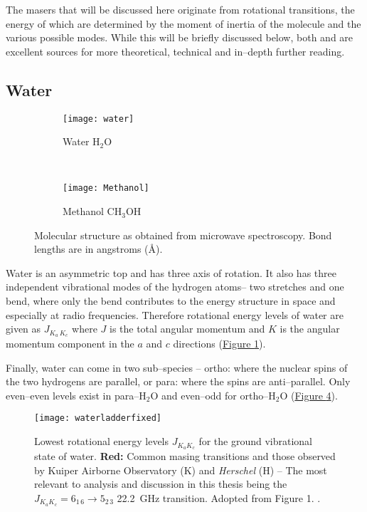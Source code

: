 			The masers that will be discussed here originate from rotational transitions, the energy of which are determined by the moment of inertia of the molecule and the various possible modes. While this will be briefly discussed below, both \citet{TowneSchawlow1955} and \citet{Gray2012} are excellent sources for more theoretical, technical and in--depth further reading.
			
		\subsection{Water}
			\begin{figure}
				\centering
				\begin{subfigure}[t]{0.45\textwidth}
					\texttt{[image: water]}
					\caption[Water molecule]{Water H$_2$O}
					\label{fig:intro_watermolecule}
				\end{subfigure}
				~
				\begin{subfigure}[t]{0.45\textwidth}
					\texttt{[image: Methanol]}
					\caption[Methanol molecule]{Methanol CH$_3$OH}
					\label{fig:intro_methanolmolecule}
				\end{subfigure}
				\caption[Microwave spectroscopy]{Molecular structure as obtained from microwave spectroscopy. Bond lengths are in angstroms (\AA).}
			\end{figure}
			
			Water is an asymmetric top and has three axis of rotation. It also has three independent vibrational modes of the hydrogen atoms-- two stretches and one bend, where only the bend contributes to the energy structure in space and especially at radio frequencies. Therefore rotational energy levels of water are given as $J_{K_a\,K_c}$ where $J$ is the total angular momentum and $K$ is the angular momentum component in the $a$ and $c$ directions (\hyperref[fig:intro_watermolecule]{Figure \ref*{fig:intro_watermolecule}}). 
			
			Finally, water can come in two sub--species -- ortho: where the nuclear spins of the two hydrogens are parallel, or para: where the spins are anti--parallel. Only even--even levels exist in para--H$_2$O and even--odd for ortho--H$_2$O (\hyperref[fig:intro_waterlevels]{Figure \ref*{fig:intro_waterlevels}}).
			
			\begin{figure}
				\centering
				\texttt{[image: waterladderfixed]}
				\caption[Water energy levels]{Lowest rotational energy levels $J_{K_a K_c}$ for the ground vibrational state of water. {\bf Red:} Common masing transitions and those observed by Kuiper Airborne Observatory (K) and {\it Herschel} (H) -- The most relevant to analysis and discussion in this thesis being the $J_{K_a K_c}=6_{1\,6}\rightarrow5_{2\,3}$ 22.2~GHz transition. Adopted from Figure 1. \citet{Neufeld2017}.}
				\label{fig:intro_waterlevels}
			\end{figure}
			
